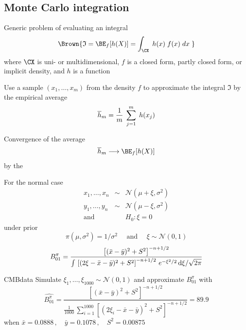 \subsection{Monte Carlo integration}\begin{slide}

Generic problem of evaluating an integral
\begin{displaymath}\Brown{
    {\mathfrak{I}} = \BE_f[h(X)] = \int_{\CX} \; h(x) \; f(x) \; dx \;
}\end{displaymath}
where $\CX$ is uni- or multidimensional, $f$ is a closed form, partly closed form, or implicit density,
and $h$ is a function

\end{slide}\begin{slide}
Use a sample $(x_1,\ldots,x_{m})$  from the density $f$ 
to approximate the integral ${\mathfrak{I}}$ by the empirical average
$$
  {\overline{h}}_{m} = {1\over m} \; \sum_{j=1}^{m} \; h(x_{j})
$$

\medskip\pause
Convergence of the average 
$$
  {\overline{h}}_{m}  \longrightarrow \BE_f[h(X)]
$$
by the {}

\end{slide}\begin{slide}

For the normal case 
\begin{eqnarray*}
x_1,\ldots,x_n&\sim&\mathscr{N}(\mu+\xi,\sigma^2)\\
y_1,\ldots,y_n&\sim&\mathscr{N}(\mu-\xi,\sigma^2)\\ 
\text{and} && H_0:\xi=0
\end{eqnarray*}
under prior 
$$
\pi(\mu,\sigma^2)=1/\sigma^2 \quad\text{ and }\quad \xi\sim\mathscr{N}(0,1)
$$
\small
$$
B^\pi_{01} = \frac{ \left[ (\bar x-\bar y)^2+S^2 \right]^{-n+1/2} }{
\int\,\left[ (2\xi-\bar x-\bar y)^2+S^2 \right]^{-n+1/2} \,e^{-\xi^2/2}\,\hbox{d}\xi/\sqrt{2\pi}}
$$
\normalsize

\end{slide}\begin{slide}
\begin{block}{{\sf CMBdata}}
Simulate $\xi_1,\ldots,\xi_{1000}\sim\mathscr{N}(0,1)$ and approximate $B^\pi_{01}$ with
\small
$$
{\widehat{B^\pi_{01}}} = \frac{ \left[ (\bar x-\bar y)^2+S^2 \right]^{-n+1/2} }{
\frac{1}{1000}\,\sum_{i=1}^{1000} \left[ (2\xi_i-\bar x-\bar y)^2+S^2 \right]^{-n+1/2} } = 89.9
$$
\normalsize
when $\bar x = 0.0888\,,\quad \bar y = 0.1078\,,\quad S^2 = 0.00875$
\end{block}


\end{slide}
